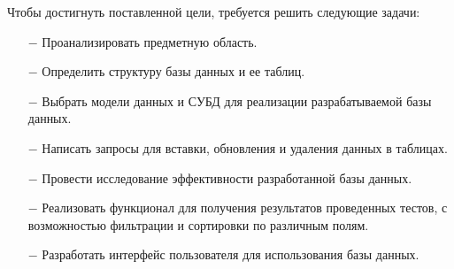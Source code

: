 Чтобы достигнуть поставленной цели, требуется решить следующие задачи: 
\begin{itemize}
    \item[$-$] Проанализировать предметную область.
    \item[$-$] Определить структуру базы данных и ее таблиц.
    \item[$-$] Выбрать модели данных и СУБД для реализации разрабатываемой базы данных.
    \item[$-$] Написать запросы для вставки, обновления и удаления данных в таблицах.
    \item[$-$] Провести исследование эффективности разработанной базы данных.
    \item[$-$] Реализовать функционал для получения результатов проведенных тестов, с возможностью фильтрации и сортировки по различным полям.
    \item[$-$] Разработать интерфейс пользователя для использования базы данных. 
\end{itemize}
